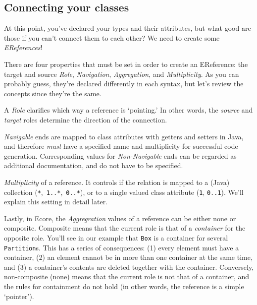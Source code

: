 \newpage
\subsection{Connecting your classes}
\genHeader
\hypertarget{static:references splash}{}

At this point, you've declared your types and their attributes, but what good are those if you can't connect them to each other? We need to create some
\emph{EReferences}!

There are four properties that must be set in order to create an EReference: the target and source \emph{Role}, \emph{Navigation}, \emph{Aggregation}, and
\emph{Multiplicity}. As you can probably guess, they're declared differently in each syntax, but let's review the concepts since they're the same.

A \emph{Role} clarifies which way a reference is `pointing.' In other words, the \emph{source} and \emph{target} roles determine the direction of the
connection.

\emph{Navigable} ends are mapped to class attributes with getters and setters in Java, and therefore \emph{must} have a specified name and
multiplicity for successful code generation. Corresponding values for \emph{Non-Navigable} ends can  be regarded as additional documentation, and do not have
to be specified.

\emph{Multiplicity} of a reference. It controls if the relation is mapped to a (Java) collection (\texttt{*},~\texttt{1..*},~\texttt{0..*}), or to a single
valued class attribute (\texttt{1}, \texttt{0..1}). We'll explain this setting in detail later.

Lastly, in Ecore, the \emph{Aggregration} values of a reference can be either none or com\-po\-site. Composite means that the current role is that of a
\emph{container} for the opposite role. You'll see in our example that \texttt{Box} is a container for several \texttt{Partition}s.
This has a series of consequences: (1) every element must have a container, (2) an element cannot be in more than one container at the same time, and (3) a
container's contents are deleted together with the container. Conversely, non-composite (none) means that the current role is not that of a container,
and the rules for containment do not hold (in other words, the reference is a simple `pointer').





